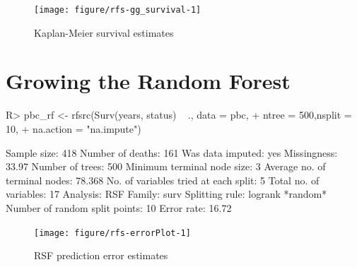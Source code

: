 \documentclass[nojss]{jss}\usepackage[]{graphicx}\usepackage[]{color}
\begin{document}
\begin{Schunk}
\begin{figure}[!htpb]

{\centering \texttt{[image: figure/rfs-gg\_survival-1]} 

}

\caption[Kaplan-Meier survival estimates]{Kaplan-Meier survival estimates\label{fig:gg_survival}}
\end{figure}
\end{Schunk}
\section{Growing the Random Forest}


\begin{Schunk}
\begin{Sinput}
R> pbc_rf <- rfsrc(Surv(years, status) ~ ., data = pbc, 
+                 ntree = 500,nsplit = 10, 
+                 na.action = "na.impute")
\end{Sinput}
\end{Schunk}


\begin{Schunk}
\begin{Soutput}
                         Sample size: 418
                    Number of deaths: 161
                    Was data imputed: yes
                         Missingness: 33.97%
                     Number of trees: 500
          Minimum terminal node size: 3
       Average no. of terminal nodes: 78.368
No. of variables tried at each split: 5
              Total no. of variables: 17
                            Analysis: RSF
                              Family: surv
                      Splitting rule: logrank *random*
       Number of random split points: 10
                          Error rate: 16.72%
\end{Soutput}
\end{Schunk}

\begin{Schunk}
\begin{figure}[!htpb]

{\centering \texttt{[image: figure/rfs-errorPlot-1]} 

}

\caption[RSF prediction error estimates]{RSF prediction error estimates\label{fig:errorPlot}}
\end{figure}
\end{Schunk}
\end{document}
